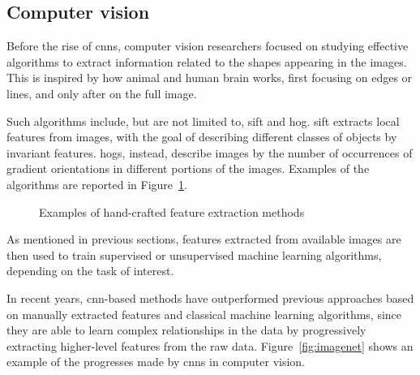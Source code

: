 \documentclass[%
    corpo=12pt,
    twoside,
    stile=classica,   
    tipotesi=magistrale,
    evenboxes,
    english,
	numerazioneromana,
]{toptesi}
\begin{document}
\subsection{Computer vision}
Before the rise of \glspl{cnn}, computer vision researchers focused on studying effective algorithms to extract information related to the shapes appearing in the images. This is inspired by how animal and human brain works, first focusing on edges or lines, and only after on the full image.

Such algorithms include, but are not limited to, \gls{sift} and \gls{hog}. \Gls{sift} extracts local features from images, with the goal of describing different classes of objects by invariant features\cite{lowe1999object}. \Glspl{hog}, instead, describe images by the number of occurrences of gradient orientations in different portions of the images\cite{dalal2005histograms}. Examples of the algorithms are reported in Figure~\ref{fig:sift_hog}.

\begin{figure}[ht]
	\centering
	\caption{Examples of hand-crafted feature extraction methods}
	\label{fig:sift_hog}
\end{figure}

As mentioned in previous sections, features extracted from available images are then used to train supervised or unsupervised machine learning algorithms, depending on the task of interest.

\medskip
In recent years, \gls{cnn}-based methods have outperformed previous approaches based on manually extracted features and classical machine learning algorithms, since they are able to learn complex relationships in the data by progressively extracting higher-level features from the raw data.
Figure~\ref{fig:imagenet} shows an example of the progresses made by \glspl{cnn} in computer vision.
\end{document}
